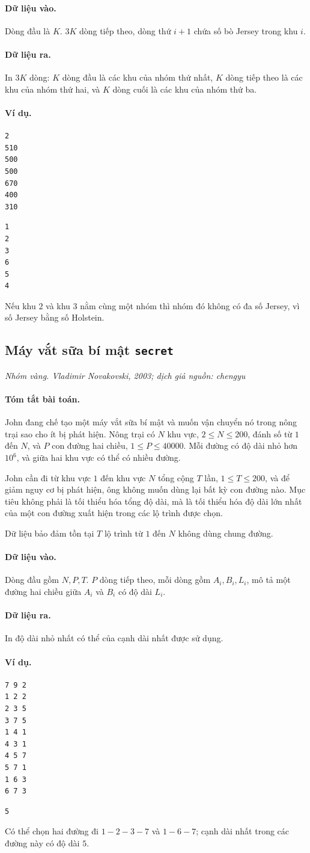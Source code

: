 \documentclass[11pt]{article}
\newcommand{\problem}[4]{%
  \subsection[#1 (#2)]{#1 \hfill {\normalsize\texttt{#2}}}%
  \noindent\textit{#3. #4}\par\smallskip
}
\newcommand{\iosec}[1]{\paragraph{#1}}
\begin{document}
\iosec{Dữ liệu vào.}
Dòng đầu là \(K\). \(3K\) dòng tiếp theo, dòng thứ \(i+1\) chứa số bò Jersey
trong khu \(i\).

\iosec{Dữ liệu ra.}
In \(3K\) dòng: \(K\) dòng đầu là các khu của nhóm thứ nhất, \(K\) dòng tiếp
theo là các khu của nhóm thứ hai, và \(K\) dòng cuối là các khu của nhóm thứ
ba.

\iosec{Ví dụ.}
\begin{verbatim}
2
510
500
500
670
400
310
\end{verbatim}

\begin{verbatim}
1
2
3
6
5
4
\end{verbatim}

Nếu khu \(2\) và khu \(3\) nằm cùng một nhóm thì nhóm đó không có đa số
Jersey, vì số Jersey bằng số Holstein.

\problem{Máy vắt sữa bí mật}{secret}{Nhóm vàng}{Vladimir Novakovski, 2003; dịch giả nguồn: chengyu}

\iosec{Tóm tắt bài toán.}
John đang chế tạo một máy vắt sữa bí mật và muốn vận chuyển nó trong nông
trại sao cho ít bị phát hiện. Nông trại có \(N\) khu vực, \(2\le N\le 200\),
đánh số từ \(1\) đến \(N\), và \(P\) con đường hai chiều,
\(1\le P\le 40000\). Mỗi đường có độ dài nhỏ hơn \(10^6\), và giữa hai khu vực
có thể có nhiều đường.

John cần đi từ khu vực \(1\) đến khu vực \(N\) tổng cộng \(T\) lần,
\(1\le T\le 200\), và để giảm nguy cơ bị phát hiện, ông không muốn dùng lại
bất kỳ con đường nào. Mục tiêu không phải là tối thiểu hóa tổng độ dài, mà là
tối thiểu hóa độ dài lớn nhất của một con đường xuất hiện trong các lộ trình
được chọn.

Dữ liệu bảo đảm tồn tại \(T\) lộ trình từ \(1\) đến \(N\) không dùng chung
đường.

\iosec{Dữ liệu vào.}
Dòng đầu gồm \(N,P,T\). \(P\) dòng tiếp theo, mỗi dòng gồm \(A_i,B_i,L_i\),
mô tả một đường hai chiều giữa \(A_i\) và \(B_i\) có độ dài \(L_i\).

\iosec{Dữ liệu ra.}
In độ dài nhỏ nhất có thể của cạnh dài nhất được sử dụng.

\iosec{Ví dụ.}
\begin{verbatim}
7 9 2
1 2 2
2 3 5
3 7 5
1 4 1
4 3 1
4 5 7
5 7 1
1 6 3
6 7 3
\end{verbatim}

\begin{verbatim}
5
\end{verbatim}

Có thể chọn hai đường đi \(1-2-3-7\) và \(1-6-7\); cạnh dài nhất trong các
đường này có độ dài \(5\).
\end{document}
